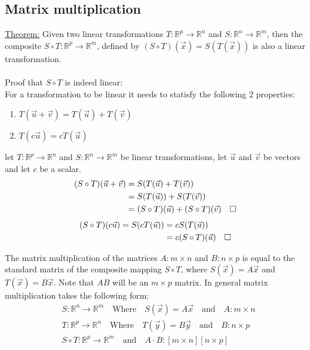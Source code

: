 \documentclass[11pt, a4paper]{article}
\newcommand*{\qed}{\hfill\ensuremath{\quad\square}}%
\begin{document}
\subsection{Matrix multiplication}
\underline{Theorem:}
Given two linear transformations $T: \mathbb{R}^p \rightarrow \mathbb{R}^n$ and 
$S: \mathbb{R}^n \rightarrow \mathbb{R}^m$, then the composite $S \circ T: \mathbb{R}^p \rightarrow \mathbb{R}^m$,
defined by $(S \circ T)(\vec{x}) = S(T(\vec{x}))$ is also a linear transformation.\\
\\
Proof that $S \circ T$ is indeed linear:\\
For a transformation to be linear it needs to statisfy the following 2 properties:
\begin{enumerate}
  \item $T(\vec{u} + \vec{v}) = T(\vec{u}) + T(\vec{v})$
  \item $T(c\vec{u}) = cT(\vec{u})$
\end{enumerate}
let $T: \mathbb{R}^p \rightarrow \mathbb{R}^n$ and $S: \mathbb{R}^n \rightarrow \mathbb{R}^m$ be linear transformations, 
let $\vec{u}$ and $\vec{v}$ be vectors and let $c$ be a scalar.
\begin{align*}
  (S \circ T)(\vec{u} + \vec{v}) &= S(T(\vec{u}) + T(\vec{v}))\\
                                 &= S(T(\vec{u})) + S(T(\vec{v}))\\
                                 &= (S \circ T)(\vec{u}) + (S \circ T)(\vec{v}) \qed
\end{align*}
\begin{align*}
  (S \circ T)(c\vec{u}) = S(cT(\vec{u})) &= cS(T(\vec{u}))\\
                                         &= c(S \circ T)(\vec{u}) \qed
\end{align*}


The matrix multiplication of the matrices $A: m\times n$ and $B: n\times p$ is equal to the standard
matrix of the composite mapping $S \circ T$, where $S(\vec{x}) = A\vec{x}$ and $T(\vec{x}) = B\vec{x}$.
Note that $AB$ will be an $m\times p$ matrix.
In general matrix multiplication takes the following form:
\begin{align*}
  &S: \mathbb{R}^n \rightarrow \mathbb{R}^m \quad \text{Where} \quad S(\vec{x}) = A\vec{x} \quad \text{and} \quad A: m \times n\\
  &T: \mathbb{R}^p \rightarrow \mathbb{R}^n \quad \text{Where} \quad T(\vec{y}) = B\vec{y} \quad \text{and} \quad B: n \times p\\
  &S \circ T: \mathbb{R}^p \rightarrow \mathbb{R}^m \quad \text{and} \quad A\cdot B : [m \times n][n \times p]\\
\end{align*}
\end{document}
